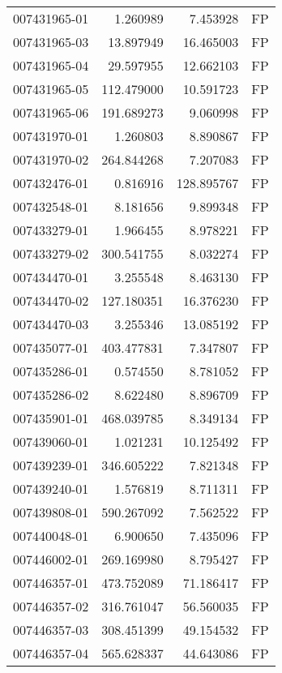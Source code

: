 \begin{tabular}{lrrl}
007431965-01 &    1.260989 &       7.453928 &   FP \\
007431965-03 &   13.897949 &      16.465003 &   FP \\
007431965-04 &   29.597955 &      12.662103 &   FP \\
007431965-05 &  112.479000 &      10.591723 &   FP \\
007431965-06 &  191.689273 &       9.060998 &   FP \\
007431970-01 &    1.260803 &       8.890867 &   FP \\
007431970-02 &  264.844268 &       7.207083 &   FP \\
007432476-01 &    0.816916 &     128.895767 &   FP \\
007432548-01 &    8.181656 &       9.899348 &   FP \\
007433279-01 &    1.966455 &       8.978221 &   FP \\
007433279-02 &  300.541755 &       8.032274 &   FP \\
007434470-01 &    3.255548 &       8.463130 &   FP \\
007434470-02 &  127.180351 &      16.376230 &   FP \\
007434470-03 &    3.255346 &      13.085192 &   FP \\
007435077-01 &  403.477831 &       7.347807 &   FP \\
007435286-01 &    0.574550 &       8.781052 &   FP \\
007435286-02 &    8.622480 &       8.896709 &   FP \\
007435901-01 &  468.039785 &       8.349134 &   FP \\
007439060-01 &    1.021231 &      10.125492 &   FP \\
007439239-01 &  346.605222 &       7.821348 &   FP \\
007439240-01 &    1.576819 &       8.711311 &   FP \\
007439808-01 &  590.267092 &       7.562522 &   FP \\
007440048-01 &    6.900650 &       7.435096 &   FP \\
007446002-01 &  269.169980 &       8.795427 &   FP \\
007446357-01 &  473.752089 &      71.186417 &   FP \\
007446357-02 &  316.761047 &      56.560035 &   FP \\
007446357-03 &  308.451399 &      49.154532 &   FP \\
007446357-04 &  565.628337 &      44.643086 &   FP \\

\end{tabular}
